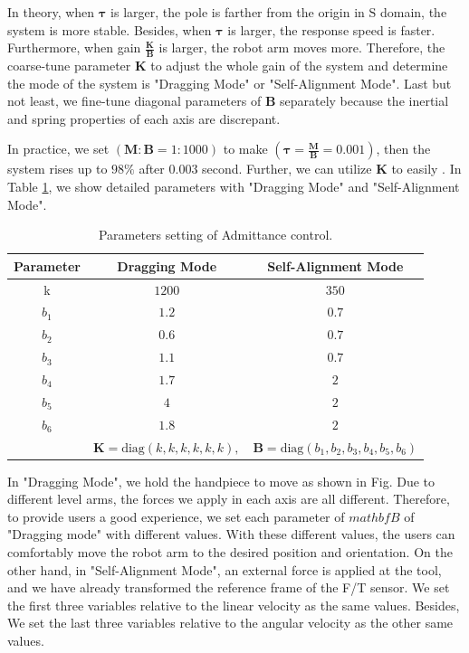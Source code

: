 \par
In theory, when $\boldsymbol{\tau}$ is larger, the pole is farther from the origin in $\mathrm{S}$ domain, the system is more stable. Besides, when $\boldsymbol{\tau}$ is larger, the response speed is faster. Furthermore, when gain $\frac{\mathbf{K}}{\mathbf{B}}$ is larger, the robot arm moves more. Therefore, the coarse-tune parameter $\mathbf{K}$ to adjust the whole gain of the system and determine the mode of the system is "Dragging Mode" or "Self-Alignment Mode". Last but not least, we fine-tune diagonal parameters of $\mathbf{B}$ separately because the inertial and spring properties of each axis are discrepant. 
\par
In practice, we set $(\mathbf{M} : \mathbf{B} = 1 : 1000)$  to make $(\boldsymbol{\tau} = \frac{\mathbf{M}}{\mathbf{B}} = 0.001)$, then the system rises up to $98\%$ after $0.003$ second. Further, we can utilize $\mathbf{K}$ to easily . In Table \ref{tab: para_adm}, we show detailed parameters with "Dragging Mode" and "Self-Alignment Mode".
\begin{table}[htbp]
\centering
\caption{Parameters setting of Admittance control.}
\label{tab: para_adm}
\begin{tabular}{ccc} 
\hline \hline
Parameter	&Dragging Mode		&Self-Alignment Mode	\\
\hline
k			&$1200$				&$350$					\\
$b_1$		&$1.2$				&$0.7$					\\
$b_2$		&$0.6$				&$0.7$					\\
$b_3$		&$1.1$				&$0.7$					\\
$b_4$		&$1.7$				&$2$					\\
$b_5$		&$4$				&$2$					\\
$b_6$		&$1.8$				&$2$					\\
\hline	
&$\mathbf{K} = \text{diag}(k,k,k,k,k,k),$ &$\mathbf{B} = \text{diag}(b_1,b_2,b_3,b_4,b_5,b_6)$\\
\hline\hline	
\end{tabular}
\end{table}
\par
In "Dragging Mode", we hold the handpiece to move as shown in Fig. Due to different level arms, the forces we apply in each axis are all different. Therefore, to provide users a good experience, we set each parameter of $mathbf{B}$ of "Dragging mode"  with different values. With these different values, the users can comfortably move the robot arm to the desired position and orientation. On the other hand, in "Self-Alignment Mode", an external force is applied at the tool, and we have already transformed the reference frame of the F/T sensor. We set the first three variables relative to the linear velocity as the same values. Besides, We set the last three variables relative to the angular velocity as the other same values.